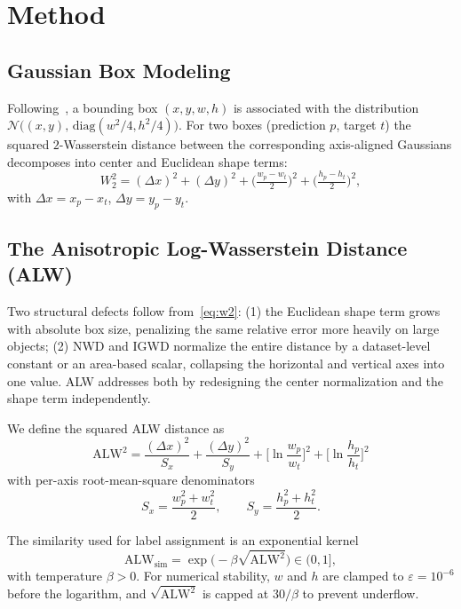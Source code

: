 \documentclass[runningheads]{llncs}
\newcommand{\alw}{\text{ALW}}
\newcommand{\alwsq}{\text{ALW}^2}
\newcommand{\Sx}{S_x}
\newcommand{\Sy}{S_y}
\begin{document}
\section{Method}
\label{sec:method}

\subsection{Gaussian Box Modeling}
Following~\cite{wang2021nwd}, a bounding box $(x,y,w,h)$ is associated with
the distribution $\mathcal{N}\!\big((x,y),\,\mathrm{diag}(w^2/4,h^2/4)\big)$.
For two boxes (prediction $p$, target $t$) the squared $2$-Wasserstein
distance between the corresponding axis-aligned Gaussians decomposes into
center and Euclidean shape terms:
\begin{equation}
W_2^2 = (\Delta x)^2 + (\Delta y)^2 +
        \Big(\tfrac{w_p-w_t}{2}\Big)^2 + \Big(\tfrac{h_p-h_t}{2}\Big)^2,
\label{eq:w2}
\end{equation}
with $\Delta x = x_p-x_t$, $\Delta y = y_p-y_t$.

\subsection{The Anisotropic Log-Wasserstein Distance (ALW)}
Two structural defects follow from~\eqref{eq:w2}: (1) the Euclidean shape
term grows with absolute box size, penalizing the same relative error more
heavily on large objects; (2) NWD and IGWD normalize the entire distance by
a dataset-level constant or an area-based scalar, collapsing the horizontal
and vertical axes into one value. ALW addresses both by redesigning the
center normalization and the shape term independently.

We define the squared ALW distance as
\begin{equation}
\boxed{\;
\alwsq = \frac{(\Delta x)^2}{\Sx} + \frac{(\Delta y)^2}{\Sy}
       + \Big[\ln\frac{w_p}{w_t}\Big]^2 + \Big[\ln\frac{h_p}{h_t}\Big]^2
\;}
\label{eq:alw}
\end{equation}
with per-axis root-mean-square denominators
\begin{equation}
\Sx = \frac{w_p^2 + w_t^2}{2}, \qquad
\Sy = \frac{h_p^2 + h_t^2}{2}.
\label{eq:Sxy}
\end{equation}

The similarity used for label assignment is an exponential kernel
\begin{equation}
\alw_{\text{sim}} = \exp\!\big(-\beta\sqrt{\alwsq}\big) \in (0,1],
\label{eq:sim}
\end{equation}
with temperature $\beta>0$. For numerical stability, $w$ and $h$ are clamped
to $\varepsilon=10^{-6}$ before the logarithm, and $\sqrt{\alwsq}$ is capped
at $30/\beta$ to prevent underflow.
\end{document}

